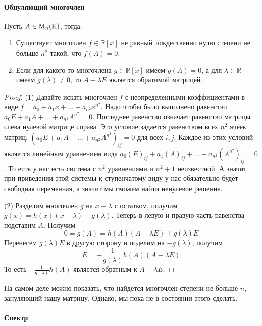 \paragraph{Обнуляющий многочлен}

\begin{claim}
\label{claim::PolyAnnihilator}
Пусть $A\in\operatorname{M}_{n}(\mathbb R)$, тогда:
\begin{enumerate}
\item Существует многочлен $f\in\mathbb R[x]$ не равный тождественно нулю степени не больше $n^2$ такой, что $f(A) = 0$.

\item Если для какого-то многочлена $g\in\mathbb R[x]$ имеем $g(A) = 0$, а для $\lambda\in\mathbb R$ имеем $g(\lambda)\neq 0$, то $A-\lambda E$ является обратимой матрицей.
\end{enumerate}
\end{claim}
\begin{proof}
(1) Давайте искать многочлен $f$ с неопределенными коэффициентами в виде $f = a_0 + a_1 x + \ldots + a_{n^2}x^{n^2}$.
Надо чтобы было выполнено равенство $a_0 E + a_1 A + \ldots + a_{n^2}A^{n^2} = 0$.
Последнее равенство означает равенство матрицы слева нулевой матрице справа.
Это условие задается равенством всех $n^2$ ячеек матриц: $(a_0 E + a_1 A + \ldots + a_{n^2}A^{n^2})_{ij} = 0$ для всех $i,j$.
Каждое из этих условий является линейным уравнением вида $a_0 (E)_{ij} + a_1 (A)_{ij} + \ldots + a_{n^2}(A^{n^2})_{ij} = 0$.
То есть у нас есть система с $n^2$ уравнениями и $n^2 + 1 $ неизвестной.
А значит при приведении этой системы к ступенчатому виду у нас обязательно будет свободная переменная, а значит мы сможем найти ненулевое решение.

(2) Разделим многочлен $g$ на $x - \lambda$ с остатком, получим $g(x) = h(x) (x-\lambda) + g(\lambda)$.
Теперь в левую и правую часть равенства подставим $A$.
Получим 
\[
0 = g(A) = h(A)(A - \lambda E) + g(\lambda)E
\]
Перенесем $g(\lambda)E$ в другую сторону и поделим на $-g(\lambda)$, получим
\[
E = -\frac{1}{g(\lambda)}h(A)(A-\lambda E)
\]
То есть $-\frac{1}{g(\lambda)}h(A)$ является обратным к $A-\lambda E$.
\end{proof}

На самом деле можно показать, что найдется многочлен степени не больше $n$, зануляющий нашу матрицу.
Однако, мы пока не в состоянии этого сделать.

\paragraph{Спектр}

